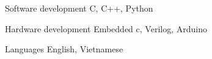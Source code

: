 

\begin{cvskills}




  \cvskill
    {Software development} %
    {C, C++, Python} %

  \cvskill
    {Hardware development} %
    {Embedded c, Verilog, Arduino} %

  \cvskill
    {Languages} %
    {English, Vietnamese} %

\end{cvskills}
